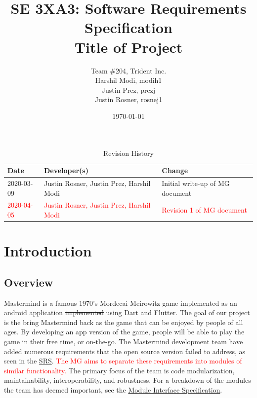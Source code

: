\documentclass[12pt, titlepage]{article}
\title{SE 3XA3: Software Requirements Specification\\Title of Project}
\author{Team \#204, Trident Inc.
		\\ Harshil Modi, modih1
		\\ Justin Prez, prezj
		\\ Justin Rosner, rosnej1
}
\date{\today}
\begin{document}
\maketitle

\tableofcontents
\listoftables
\listoffigures

\begin{table}[H]
\caption{Revision History} \label{TblRevisionHistory}
\begin{tabularx}{\textwidth}{llX}
\toprule
\textbf{Date} & \textbf{Developer(s)} & \textbf{Change}\\
\midrule
2020-03-09 & Justin Rosner, Justin Prez, Harshil Modi & Initial write-up of MG document\\

\textcolor{red}{2020-04-05} & \textcolor{red}{Justin Rosner, Justin Prez, Harshil Modi} & \textcolor{red}{Revision 1 of MG document}\\
\bottomrule
\end{tabularx}
\end{table}

\newpage


\section{Introduction}
\subsection{Overview}
Mastermind is a famous 1970's Mordecai Meirowitz game implemented as an android application \sout{implemented} using Dart and Flutter. The goal of our project is the bring Mastermind back as the game that can be enjoyed by people of all ages. By developing an app version of the game, people will be able to play the game in their free time, or on-the-go. The Mastermind development team have added numerous requirements that the open source version failed to address, as seen in the \href{https://gitlab.cas.mcmaster.ca/rosnej1/open-mastermind/-/blob/master/Doc/SRS/SRS.pdf}{SRS}. \textcolor{red}{The MG aims to separate these requirements into modules of similar functionality.} The primary focus of the team is code modularization, maintainability, interoperability, and robustness. For a breakdown of the modules the team has deemed important, see the \href{https://gitlab.cas.mcmaster.ca/rosnej1/open-mastermind/-/tree/master/Doc/Design/MIS/MIS.pdf}{Module Interface Specification}. 
\end{document}
